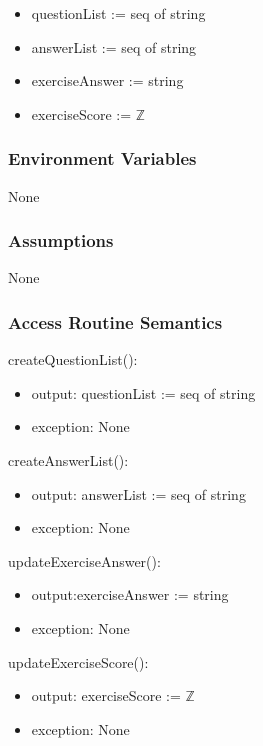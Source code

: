 \documentclass[12pt, titlepage]{article}
\begin{document}
\begin{itemize}
    \item questionList := seq of string
    \item answerList := seq of string
    \item exerciseAnswer := string 
    \item exerciseScore := $\mathbb{Z}$ 
\end{itemize}

\subsubsection{Environment Variables}

None 

\subsubsection{Assumptions}

None 

\subsubsection{Access Routine Semantics}

\noindent createQuestionList(): 
\begin{itemize}
\item output: questionList := seq of string
\item exception: None
\end{itemize}

\noindent createAnswerList(): 
\begin{itemize}
\item output: answerList := seq of string
\item exception: None
\end{itemize}


\noindent updateExerciseAnswer(): 
\begin{itemize}
\item output:exerciseAnswer := string \\
\item exception: None
\end{itemize}

\noindent updateExerciseScore(): 
\begin{itemize}
\item output: exerciseScore := $\mathbb{Z}$ \\
\item exception: None
\end{itemize}
\end{document}
